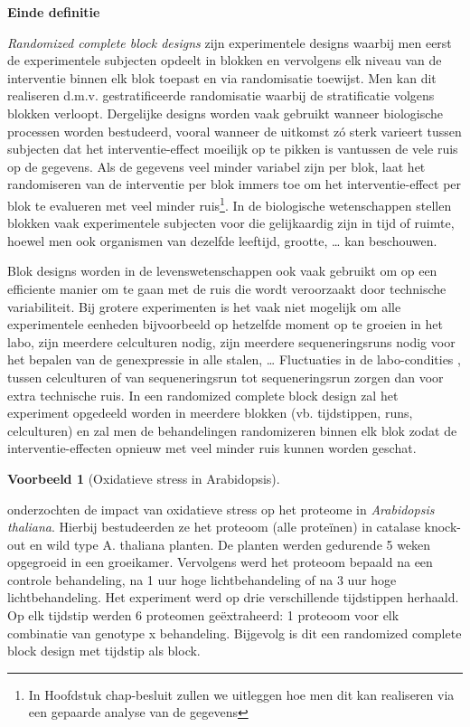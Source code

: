 \documentclass[
  12pt,dutch,coursenotes]{book}
\theoremstyle{definition}
\theoremstyle{definition}
\newtheorem{example}{Voorbeeld}[chapter]
\theoremstyle{definition}
\theoremstyle{definition}
\theoremstyle{remark}
\begin{document}
\textbf{Einde definitie}

\emph{Randomized complete block designs} zijn experimentele designs waarbij men eerst de experimentele subjecten opdeelt in blokken en vervolgens elk niveau van de interventie binnen elk blok toepast en via randomisatie toewijst. Men kan dit realiseren d.m.v. gestratificeerde randomisatie waarbij de stratificatie volgens blokken verloopt. Dergelijke designs worden vaak gebruikt wanneer biologische processen worden bestudeerd, vooral wanneer de uitkomst zó sterk varieert tussen subjecten dat het interventie-effect moeilijk op te pikken is vantussen de vele ruis op de gegevens. Als de gegevens veel minder variabel zijn per blok, laat het randomiseren van de interventie per blok immers toe om het interventie-effect per blok te evalueren met veel minder ruis\footnote{In Hoofdstuk chap-besluit zullen we uitleggen hoe men dit kan realiseren via een gepaarde analyse van de gegevens}. In de biologische wetenschappen stellen blokken vaak experimentele subjecten voor die gelijkaardig zijn in tijd of ruimte, hoewel men ook organismen van dezelfde leeftijd, grootte, \ldots{} kan beschouwen.

Blok designs worden in de levenswetenschappen ook vaak gebruikt om op een efficiente manier om te gaan met de ruis die wordt veroorzaakt door technische variabiliteit. Bij grotere experimenten is het vaak niet mogelijk om alle experimentele eenheden bijvoorbeeld op hetzelfde moment op te groeien in het labo, zijn meerdere celculturen nodig, zijn meerdere sequeneringsruns nodig voor het bepalen van de genexpressie in alle stalen, \ldots{} Fluctuaties in de labo-condities , tussen celculturen of van sequeneringsrun tot sequeneringsrun zorgen dan voor extra technische ruis. In een randomized complete block design zal het experiment opgedeeld worden in meerdere blokken (vb. tijdstippen, runs, celculturen) en zal men de behandelingen randomizeren binnen elk blok zodat de interventie-effecten opnieuw met veel minder ruis kunnen worden geschat.

\begin{example}[Oxidatieve stress in Arabidopsis]
\protect\hypertarget{exm:unnamed-chunk-73}{}{\label{exm:unnamed-chunk-73} {} }
\end{example}
\citet{Jacques2015} onderzochten de impact van oxidatieve stress op het proteome in \emph{Arabidopsis thaliana}. Hierbij bestudeerden ze het proteoom (alle proteïnen) in catalase knock-out en wild type A. thaliana planten. De planten werden gedurende 5 weken opgegroeid in een groeikamer. Vervolgens werd het proteoom bepaald na een controle behandeling, na 1 uur hoge lichtbehandeling of na 3 uur hoge lichtbehandeling. Het experiment werd op drie verschillende tijdstippen herhaald. Op elk tijdstip werden 6 proteomen geëxtraheerd: 1 proteoom voor elk combinatie van genotype x behandeling. Bijgevolg is dit een randomized complete block design met tijdstip als block.
\end{document}
